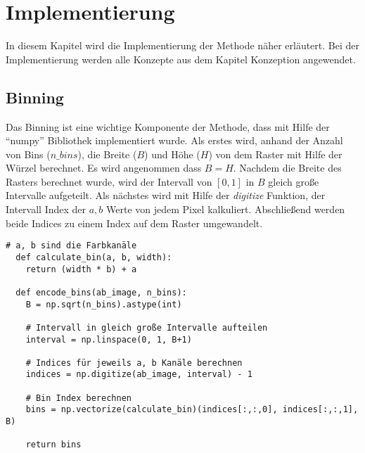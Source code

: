\chapter{Implementierung}
In diesem Kapitel wird die Implementierung der Methode näher erläutert. Bei der Implementierung werden alle Konzepte aus dem
Kapitel Konzeption angewendet.



  

\section{Binning}
Das Binning ist eine wichtige Komponente der Methode, dass mit Hilfe der ``numpy'' Bibliothek implementiert wurde. Als erstes wird, 
anhand der Anzahl von Bins ($n\_bins$), die Breite ($B$) und Höhe ($H$) von dem Raster mit Hilfe der Würzel berechnet. 
Es wird angenommen dass $B = H$.
Nachdem die Breite des Rasters berechnet wurde, wird der Intervall von $[0, 1]$ in $B$ gleich große Intervalle aufgeteilt. Als nächstes
wird mit Hilfe der \textit{digitize} Funktion, der Intervall Index der $a, b$ Werte von jedem Pixel kalkuliert. Abschließend werden beide Indices
zu einem Index auf dem Raster umgewandelt.
\\

\begin{lstlisting}[caption={Binning eines normalisierten Lab Bildes}]
  # a, b sind die Farbkanäle
  def calculate_bin(a, b, width):
    return (width * b) + a

  def encode_bins(ab_image, n_bins):
    B = np.sqrt(n_bins).astype(int)

    # Intervall in gleich große Intervalle aufteilen
    interval = np.linspace(0, 1, B+1)

    # Indices für jeweils a, b Kanäle berechnen
    indices = np.digitize(ab_image, interval) - 1

    # Bin Index berechnen
    bins = np.vectorize(calculate_bin)(indices[:,:,0], indices[:,:,1], B)

    return bins
\end{lstlisting}

